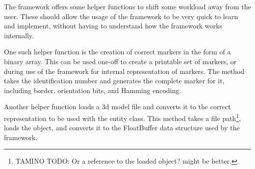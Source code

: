 The framework offers some helper functions to shift some workload away from the user.
These should allow the usage of the framework to be very quick to learn and implement, without having to understand how the framework works internally.

One such helper function is the creation of correct markers in the form of a binary array.
This can be used one-off to create a printable set of markers, or during use of the framework for internal representation of markers.
The method takes the identification number and generates the complete marker for it, including border, orientation bits, and Hamming encoding.

Another helper function loads a 3d model file and converts it to the correct representation to be used with the entity class.
This method takes a file path\footnote{TAMINO TODO: Or a reference to the loaded object? might be better.}, loads the object, and converts it to the FloatBuffer data structure used by the framework.
